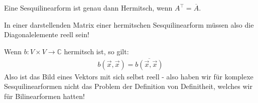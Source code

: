 \documentclass{report}
\newcommand{\bC}{\mathbb{C}}
\newcommand{\vx}{\vec{x}}
\begin{document}
\begin{proposition}
 Eine Sesquilinearform ist genau dann Hermitsch, wenn $A^\top = \overline{A}$.
\end{proposition}
\begin{beobachtung}
 In einer darstellenden Matrix einer hermitschen Sesquilinearform müssen also die Diagonalelemente reell sein!
\end{beobachtung}
\begin{beobachtung}
 Wenn $b : V \times V \to \bC$ hermitsch ist, so gilt:
 \begin{align*}
  b(\vx, \vx) = \overline{b(\vx, \vx)}
 \end{align*}
 Also ist das Bild eines Vektors mit sich selbst reell - also haben wir für komplexe Sesquilinearformen nicht das Problem der Definition von Definitheit, welches wir für Bilinearformen hatten!
\end{beobachtung}
%
%
%
%
%
%
%
%
%
%
%
%
%
%
%
%
%
\end{document}

